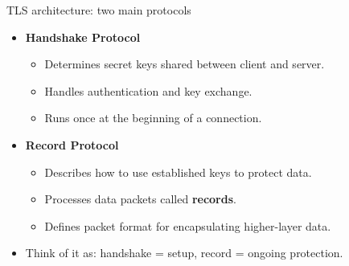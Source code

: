 \ifdefined\PRESENTATION\else\PassOptionsToClass{handout}{beamer}\fi\documentclass[aspectratio=169, lualatex]{beamer}
\begin{document}
\begin{frame}{TLS architecture: two main protocols}
	\begin{itemize}[<+->]
		\item \textbf{Handshake Protocol}
		      \begin{itemize}
			      \item Determines secret keys shared between client and server.
			      \item Handles authentication and key exchange.
			      \item Runs once at the beginning of a connection.
		      \end{itemize}
		\item \textbf{Record Protocol}
		      \begin{itemize}
			      \item Describes how to use established keys to protect data.
			      \item Processes data packets called \textbf{records}.
			      \item Defines packet format for encapsulating higher-layer data.
		      \end{itemize}
		\item Think of it as: handshake = setup, record = ongoing protection.
	\end{itemize}
\end{frame}
\end{document}
